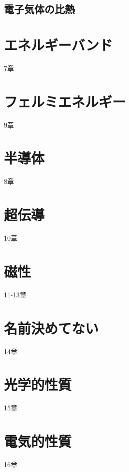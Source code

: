 \documentclass[a4paper]{jsreport}
\begin{document}
        \section{電子気体の比熱}



    \chapter{エネルギーバンド}
        7章
    \chapter{フェルミエネルギー}
        9章
    \chapter{半導体}
        8章
    \chapter{超伝導}
        10章
    \chapter{磁性}
        11-13章
    \chapter{名前決めてない}
        14章
    \chapter{光学的性質}
        15章
    \chapter{電気的性質}
        16章
    
            
\end{document}
